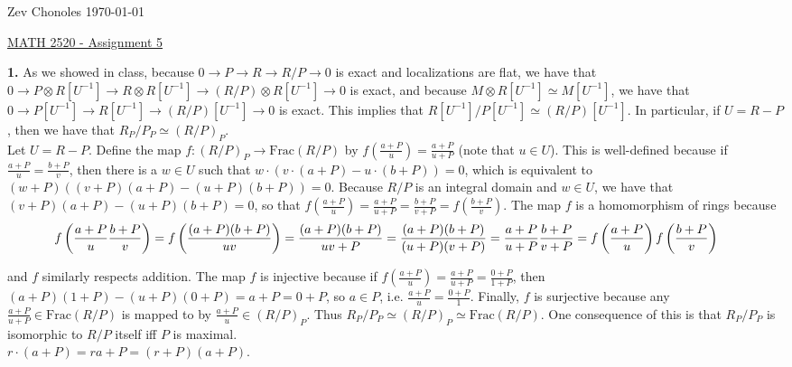 \documentclass[11pt]{article}
\newcommand{\num}[1]{\noindent \textbf{#1}}
\theoremstyle{definition}
\begin{document}
\noindent Zev Chonoles \hfill \today\\[-0.4in]
\begin{center}
\noindent \underline{MATH 2520 - Assignment 5}
\end{center}

\num{1.} As we showed in class, because $0\rightarrow P\rightarrow
R\rightarrow R/P\rightarrow0$ is exact and localizations are flat, we have that
$0\rightarrow P\otimes R[U^{-1}]\rightarrow R\otimes R[U^{-1}]\rightarrow
(R/P)\otimes R[U^{-1}]\rightarrow0$ is exact, and because $M\otimes
R[U^{-1}]\simeq M[U^{-1}]$, we have that $0\rightarrow P[U^{-1}]\rightarrow
R[U^{-1}]\rightarrow (R/P)[U^{-1}]\rightarrow0$ is exact. This implies that
$R[U^{-1}]/P[U^{-1}]\simeq (R/P)[U^{-1}]$. In particular, if $U=R-P$, then
we have that $R_P/P_P\simeq (R/P)_P$.\\

\noindent Let $U=R-P$. Define the map $f:(R/P)_P\rightarrow\text{Frac}(R/P)$
by $f(\frac{a+P}{u})=\frac{a+P}{u+P}$ (note that $u\in U$). This
is well-defined because if $\frac{a+P}{u}=\frac{b+P}{v}$, then there
is a $w\in U$ such that $w\cdot(v\cdot(a+P)-u\cdot(b+P))=0$, which
is equivalent to $(w+P)((v+P)(a+P)-(u+P)(b+P))=0$. Because $R/P$ is an
integral domain and $w\in U$, we have that $(v+P)(a+P)-(u+P)(b+P)=0$, so
that $f(\frac{a+P}{u})=\frac{a+P}{u+P}=\frac{b+P}{v+P}=f(\frac{b+P}{v})$. The
map $f$ is a homomorphism of rings because 
\small
\[\hskip-0.2in
f\left(\frac{a+P}{u}\frac{b+P}{v}\right)=f\left(\frac{(a+P)(b+P)}{uv}\right)=\frac{(a+P)(b+P)}{uv+P}=\frac{(a+P)(b+P)}{(u+P)(v+P)}=\frac{a+P}{u+P}\frac{b+P}{v+P}=f\left(\frac{a+P}{u}\right)f\left(\frac{b+P}{v}\right)\]

\normalsize
and $f$ similarly respects addition. The map $f$ is injective
because if $f(\frac{a+P}{u})=\frac{a+P}{u+P}=\frac{0+P}{1+P}$,
then $(a+P)(1+P)-(u+P)(0+P)=a+P=0+P$, so $a\in P$,
i.e. $\frac{a+P}{u}=\frac{0+P}{1}$. Finally, $f$ is surjective because
any $\frac{a+P}{u+P}\in\text{Frac}(R/P)$ is mapped to by $\frac{a+P}{u}\in
(R/P)_P$. Thus $R_P/P_P\simeq (R/P)_P\simeq\text{Frac}(R/P)$. One consequence
of this is that $R_P/P_P$ is isomorphic to $R/P$ itself iff $P$ is maximal. \\

$r\cdot(a+P)=ra+P=(r+P)(a+P)$. 
\end{document}
